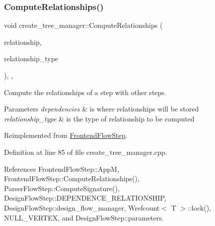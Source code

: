 \mbox{\label{classcreate__tree__manager_ac60f96c1a28f6faf3480e832f071ceb0}} 
\subsubsection{\texorpdfstring{Compute\+Relationships()}{ComputeRelationships()}}
{\footnotesize\ttfamily void create\+\_\+tree\+\_\+manager\+::\+Compute\+Relationships (\begin{DoxyParamCaption}\item[{\hyperlink{classDesignFlowStepSet}{Design\+Flow\+Step\+Set} \&}]{relationship,  }\item[{const \hyperlink{classDesignFlowStep_a723a3baf19ff2ceb77bc13e099d0b1b7}{Design\+Flow\+Step\+::\+Relationship\+Type}}]{relationship\+\_\+type }\end{DoxyParamCaption})\hspace{0.3cm}{\ttfamily [override]}, {\ttfamily [private]}, {\ttfamily [virtual]}}



Compute the relationships of a step with other steps. 


\begin{DoxyParams}{Parameters}
{\em dependencies} & is where relationships will be stored \\
\hline
{\em relationship\+\_\+type} & is the type of relationship to be computed \\
\hline
\end{DoxyParams}


Reimplemented from \hyperlink{classFrontendFlowStep_a532ee0d76d7a10c373b4a7478a7eee18}{Frontend\+Flow\+Step}.



Definition at line 85 of file create\+\_\+tree\+\_\+manager.\+cpp.



References Frontend\+Flow\+Step\+::\+AppM, Frontend\+Flow\+Step\+::\+Compute\+Relationships(), Parser\+Flow\+Step\+::\+Compute\+Signature(), Design\+Flow\+Step\+::\+D\+E\+P\+E\+N\+D\+E\+N\+C\+E\+\_\+\+R\+E\+L\+A\+T\+I\+O\+N\+S\+H\+IP, Design\+Flow\+Step\+::design\+\_\+flow\+\_\+manager, Wrefcount$<$ T $>$\+::lock(), N\+U\+L\+L\+\_\+\+V\+E\+R\+T\+EX, and Design\+Flow\+Step\+::parameters.

